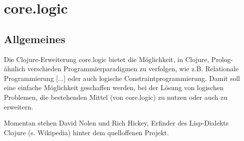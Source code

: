 \section{core.logic} 

\subsection{Allgemeines}

Die Clojure-Erweiterung core.logic bietet die Möglichkeit, in Clojure, Prolog-ähnlich verschieden Programmierparadigmen zu verfolgen, wie z.B. Relationale Programmierung [...] oder auch logische Constraintprogrammierung. Damit soll eine einfache Möglichkeit geschaffen werden, bei der Lösung von logischen Problemen, die bestehenden Mittel (von core.logic) zu nutzen oder auch zu erweitern.

Momentan stehen David Nolen und Rich Hickey, Erfinder des Lisp-Dialekts Clojure (s. Wikipedia) hinter dem quelloffenen Projekt.

\subsection{}